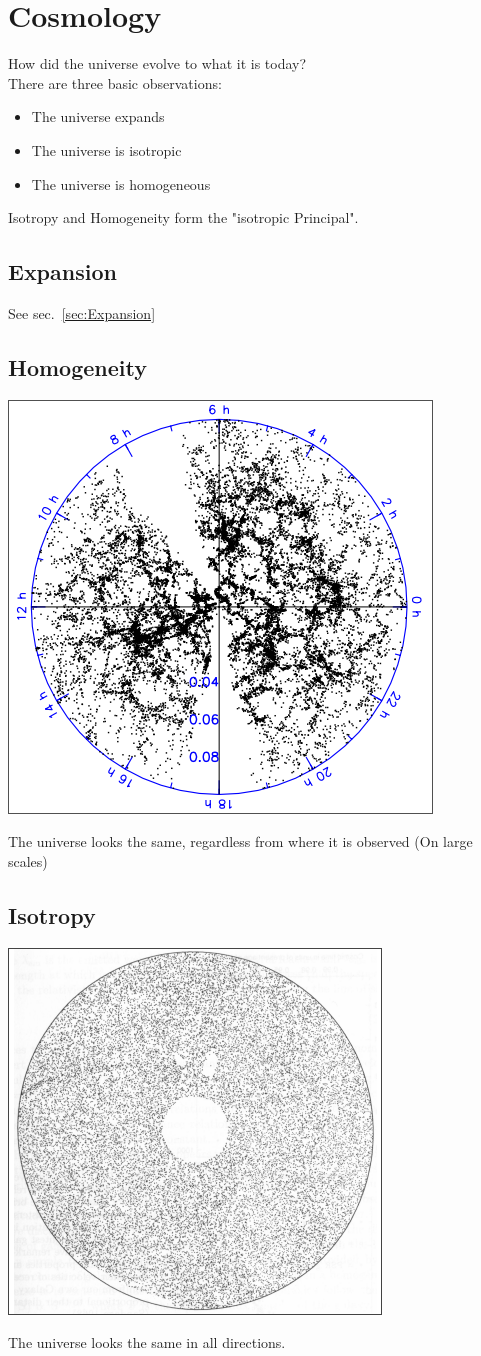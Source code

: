 \documentclass[11pt,a4paper]{article}
\begin{document}
\section{Cosmology}
How did the universe evolve to what it is today? \\
There are three basic observations:
 \begin{itemize}
     \item The universe expands
     \item The universe is isotropic
     \item The universe is homogeneous
 \end{itemize}
 Isotropy and Homogeneity form the "isotropic Principal".
 \subsection{Expansion}
 See sec.~\ref{sec:Expansion}
\subsection{Homogeneity}
 
\begin{center}
    \includegraphics[width=0.6\linewidth]{screenshot_2024-01-27-143129.png}
\end{center}
The universe
looks the same, regardless from
where it is observed (On large scales)
\subsection{Isotropy}
\begin{center}
    \includegraphics[width=0.6\linewidth]{screenshot_2024-01-27-143414.png}
\end{center}
The universe looks
the same in all directions.
\end{document}

